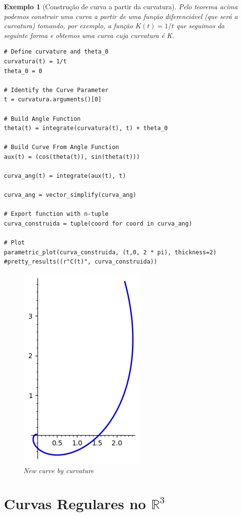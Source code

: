 \documentclass[12pt]{article}
\newtheorem{ex}{Exemplo}[section]
\begin{document}
\begin{ex}[Construção de curva a partir da curvatura]
Pelo teorema acima podemos construir uma curva a partir de uma função diferenciável (que será a curvatura) tomando, por exemplo, a função $K(t) = 1/t$ que seguimos da seguinte forma e obtemos uma curva cuja curvatura é K.

\begin{lstlisting}
# Define curvature and theta_0
curvatura(t) = 1/t
theta_0 = 0

# Identify the Curve Parameter
t = curvatura.arguments()[0]
    
# Build Angle Function
theta(t) = integrate(curvatura(t), t) + theta_0

# Build Curve From Angle Function
aux(t) = (cos(theta(t)), sin(theta(t)))

curva_ang(t) = integrate(aux(t), t)

curva_ang = vector_simplify(curva_ang)
    
# Export function with n-tuple
curva_construida = tuple(coord for coord in curva_ang)

# Plot
parametric_plot(curva_construida, (t,0, 2 * pi), thickness=2)
#pretty_results((r"C(t)", curva_construida))
\end{lstlisting}

\begin{figure}[H]
    \centering
    \includegraphics[scale=.6]{Images/ex4.2.png}
    \caption{New curve by curvature}
    \label{fig:ex4.2}
\end{figure}
\end{ex}

\section{Curvas Regulares no $\mathbb{R}^3$}\label{s5}




\end{document}

